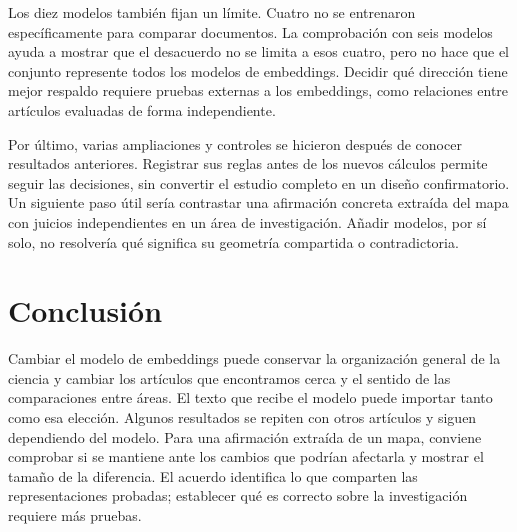 Los diez modelos también fijan un límite. Cuatro no se entrenaron específicamente para comparar documentos. La comprobación con seis modelos ayuda a mostrar que el desacuerdo no se limita a esos cuatro, pero no hace que el conjunto represente todos los modelos de embeddings. Decidir qué dirección tiene mejor respaldo requiere pruebas externas a los embeddings, como relaciones entre artículos evaluadas de forma independiente.

Por último, varias ampliaciones y controles se hicieron después de conocer resultados anteriores. Registrar sus reglas antes de los nuevos cálculos permite seguir las decisiones, sin convertir el estudio completo en un diseño confirmatorio. Un siguiente paso útil sería contrastar una afirmación concreta extraída del mapa con juicios independientes en un área de investigación. Añadir modelos, por sí solo, no resolvería qué significa su geometría compartida o contradictoria.

\section{Conclusión}
Cambiar el modelo de embeddings puede conservar la organización general de la ciencia y cambiar los artículos que encontramos cerca y el sentido de las comparaciones entre áreas. El texto que recibe el modelo puede importar tanto como esa elección. Algunos resultados se repiten con otros artículos y siguen dependiendo del modelo. Para una afirmación extraída de un mapa, conviene comprobar si se mantiene ante los cambios que podrían afectarla y mostrar el tamaño de la diferencia. El acuerdo identifica lo que comparten las representaciones probadas; establecer qué es correcto sobre la investigación requiere más pruebas.
